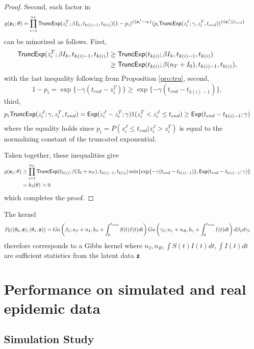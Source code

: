 \documentclass[11pt]{article}
\begin{document}
\begin{proof}
		Second, each factor in
		\begin{align*}
			& g(\mathbf{z}_1; \theta) = \prod_{i=1}^{n_T} \textsf{TruncExp}(z^T_i; \beta I_k, t_{k(i)-1}, t_{k(i)}) (1-p_i)^{1\{\mathbf{z}^J_i = \infty\}} (p_i \textsf{TruncExp}(z^J_i; \gamma, z^T_i, t_{end}))^{1\{\mathbf{z}^J_i \le t_{end}\}}
		\end{align*}
		can be minorized as follows. First,
		\begin{align*}
			\textsf{TruncExp}(z^T_i; \beta I_k, t_{k(i)-1}, t_{k(i)}) 
			& \ge \textsf{TruncExp}(t_{k(i)}; \beta I_k, t_{k(i)-1}, t_{k(i)}) \\
			& \ge \textsf{TruncExp}(t_{k(i)}; \beta (n_T + I_0), t_{k(i)-1}, t_{k(i)}),
		\end{align*}
		with the last inequality following from Proposition \ref{pro:tru}, second,
		$$1-p_i = \exp\{-\gamma (t_{end} - z^T_i)\} \ge \exp\{-\gamma (t_{end} - t_{k(i)-1})\},$$
		third,
		$$p_i \textsf{TruncExp}(z^J_i; \gamma, z^T_i, t_{end}) = \textsf{Exp}(z^J_i - z^T_i; \gamma)1(z^T_i < z^J_i \le t_{end}) \ge \textsf{Exp}(t_{end} - t_{k(i) - 1}; \gamma)$$
		where the equality holds since $p_i = P(z^J_i \le t_{end}|z^J_i > z^T_i)$ is equal to the normalizing constant of the truncated exponential.
		
		Taken together, these inequalities give
		\begin{align*}
			g(\mathbf{z}_1; \theta)
			& \ge \prod_{i=1}^{n_T} \textsf{TruncExp}(t_{k(i)}; \beta (I_0 + n_T), t_{k(i)-1}, t_{k(i)}) \min\{\exp\{-\gamma (t_{end} - t_{k(i) - 1})\}, \textsf{Exp}(t_{end} - t_{k(i) - 1}; \gamma)\} \\
			& = k_2(\theta) > 0
		\end{align*}
		which completes the proof.
	\end{proof}
	
	
	
	The kernel 
	$$
	P_{\theta}((\theta_0, \mathbf{z}), (\theta_1, \mathbf{z})) = Ga\left( \beta_1; a_{\beta} + n_I, b_{\beta} + \int_0^{t_{end}} S(t)I(t) dt\right) Ga\left( \gamma_1; a_{\gamma} + n_R, b_{\gamma} + \int_0^{t_{end}} I(t) dt\right) d\beta_1 d\gamma_1
	$$
	therefore corresponds to a Gibbs kernel where $n_I, n_R, \int S(t)I(t) dt, \int I(t) dt$ are sufficient statistics from the latent data $\mathbf{z}$
	
	\section{Performance on simulated and real epidemic data}
	\label{sec:per}
	
	\subsection{Simulation Study}
	\label{sec:sim}
	
\end{document}
